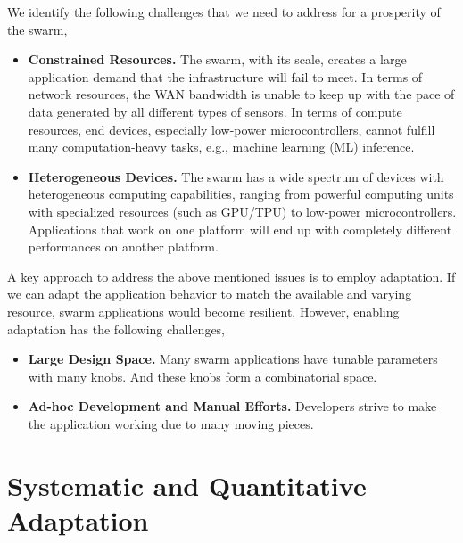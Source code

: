 \documentclass[thesis.tex]{subfiles}
\begin{document}
We identify the following challenges that we need to address for a prosperity of
the swarm,

\begin{itemize}[topsep=5pt, itemsep=2pt]

\item \textbf{Constrained Resources.} The swarm, with its scale, creates a large
application demand that the infrastructure will fail to meet. In terms of
network resources, the WAN bandwidth is unable to keep up with the pace of data
generated by all different types of sensors. In terms of compute resources, end
devices, especially low-power microcontrollers, cannot fulfill many
computation-heavy tasks, e.g., machine learning (ML) inference.

\item \textbf{Heterogeneous Devices.} The swarm has a wide spectrum of devices with
heterogeneous computing capabilities, ranging from powerful computing units with
specialized resources (such as GPU/TPU) to low-power
microcontrollers. Applications that work on one platform will end up with
completely different performances on another platform.

\end{itemize}

A key approach to address the above mentioned issues is to employ adaptation. If
we can adapt the application behavior to match the available and varying
resource, swarm applications would become resilient. However, enabling
adaptation has the following challenges,

\begin{itemize}[topsep=5pt, itemsep=2pt]

\item \textbf{Large Design Space.} Many swarm applications have tunable
  parameters with many knobs. And these knobs form a combinatorial space.

\item \textbf{Ad-hoc Development and Manual Efforts.} Developers strive to make
  the application working due to many moving pieces.

\end{itemize}

\section{Systematic and Quantitative Adaptation}
\label{sec:adaptation}

\end{document}
